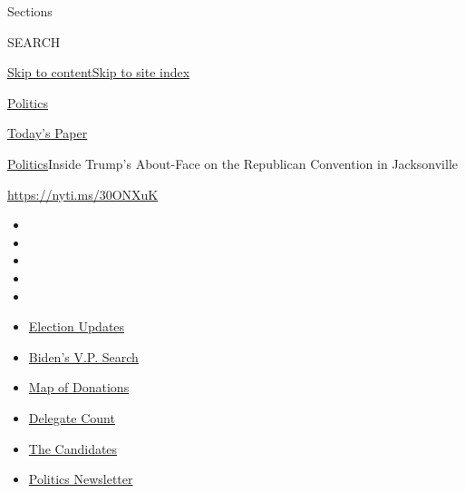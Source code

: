 Sections

SEARCH

\protect\hyperlink{site-content}{Skip to
content}\protect\hyperlink{site-index}{Skip to site index}

\href{https://www.nytimes.com/section/politics}{Politics}

\href{https://myaccount.nytimes.com/auth/login?response_type=cookie\&client_id=vi}{}

\href{https://www.nytimes.com/section/todayspaper}{Today's Paper}

\href{/section/politics}{Politics}\textbar{}Inside Trump's About-Face on
the Republican Convention in Jacksonville

\url{https://nyti.ms/30ONXuK}

\begin{itemize}
\item
\item
\item
\item
\item
\end{itemize}

\begin{itemize}
\item
  \href{https://www.nytimes.com/2020/07/31/us/elections/biden-vs-trump.html?action=click\&pgtype=Article\&state=default\&region=TOP_BANNER\&context=storylines_menu}{Election
  Updates}
\item
  \href{https://www.nytimes.com/article/biden-vice-president-2020.html?action=click\&pgtype=Article\&state=default\&region=TOP_BANNER\&context=storylines_menu}{Biden's
  V.P. Search}
\item
  \href{https://www.nytimes.com/interactive/2020/07/24/us/politics/trump-biden-campaign-donors.html?action=click\&pgtype=Article\&state=default\&region=TOP_BANNER\&context=storylines_menu}{Map
  of Donations}
\item
  \href{https://www.nytimes.com/interactive/2020/us/elections/delegate-count-primary-results.html?action=click\&pgtype=Article\&state=default\&region=TOP_BANNER\&context=storylines_menu}{Delegate
  Count}
\item
  \href{https://www.nytimes.com/interactive/2019/us/politics/2020-presidential-candidates.html?action=click\&pgtype=Article\&state=default\&region=TOP_BANNER\&context=storylines_menu}{The
  Candidates}
\item
  \href{https://www.nytimes.com/newsletters/politics?action=click\&pgtype=Article\&state=default\&region=TOP_BANNER\&context=storylines_menu}{Politics
  Newsletter}
\end{itemize}

